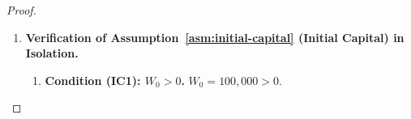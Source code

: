 \documentclass[12pt,openany]{book}
\newcommand{\calF}{\mathcal{F}}
\newcommand{\Prob}{\mathbb{P}}
\numberwithin{equation}{chapter}
\theoremstyle{plain}
\theoremstyle{definition}
\theoremstyle{remark}
\numberwithin{equation}{chapter}
\theoremstyle{plain}
\begin{document}
\begin{proof}
\begin{enumerate}[label=\textbf{Phase~\Roman*.}]
\begin{enumerate}[label=\textbf{Step~2.\arabic*.}]
  \item \textbf{Condition \textbf{(PS4)}: Completeness of
        $(\Omega,\calF,\Prob)$.}
        By construction in Step~1.2, $\calF$ is the
        $\Prob_{\mathrm{raw}}$-completion of $\calF_{\mathrm{raw}}$.
        Completeness is definitional: if $N \in \calF$ with
        $\Prob(N) = 0$ and $M \subseteq N$, then $M \in \calF$ by
        the definition of the completion.
        \hfill\checkmark

  \item \textbf{Condition \textbf{(PS5)}: Filtration
        $\mathbb{F}$ is a right-continuous complete filtration.}
        \begin{enumerate}[label=\textbf{(PS5.\alph*)}]
          \item \emph{Completeness of each $\calF_t$.}
                Each $\calF_t$ in~\eqref{eq:cons-filtration} is
                defined as a $\Prob$-completion, so contains all
                $\Prob$-null sets.
          \item \emph{Right-continuity.}
                Since $\Omega = [0,1]^T$ is a finite-dimensional
                product, the natural filtration generated by
                coordinate projections is already right-continuous
                at every dyadic time point; in the discrete-time
                setting $\mathcal{T} = \{0,\ldots,T\}$,
                right-continuity is vacuous (every point is isolated).
          \item \emph{Monotonicity.}
                For $s \leq t$, $\pi_u$ is $\calF_t$-measurable
                for all $u \leq s \leq t$, so
                $\calF_s \subseteq \calF_t$.
        \end{enumerate}
        \hfill\checkmark

\end{enumerate}

All sub-conditions \textbf{(PS1)}--\textbf{(PS5)} are satisfied.

\item \textbf{Verification of Assumption~\ref{asm:initial-capital}
              (Initial Capital) in Isolation.}

\begin{enumerate}[label=\textbf{Step~3.\arabic*.}]

  \item \textbf{Condition \textbf{(IC1)}: $W_0 > 0$.}
        $W_0 = 100{,}000 > 0$.
        \hfill\checkmark


\end{enumerate}
\end{enumerate}
\end{proof}
\end{document}
